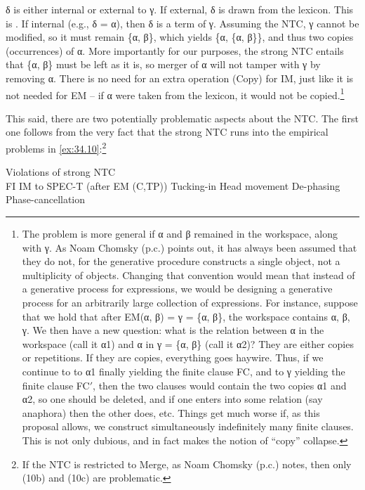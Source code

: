 \documentclass[output=paper]{langsci/langscibook}
\begin{document}
δ is either internal or external to γ. If external, δ is drawn from the
lexicon. This is . If internal (e.g., δ = α), then δ is a term of
γ.  Assuming the \gls{NTC}, γ cannot be modified, so it must remain \{α, β\},
which yields \{α, \{α, β\}\}, and thus two copies (occurrences) of α.  More
importantly for our purposes, the strong \gls{NTC} entails that \{α, β\} must be
left as it is, so merger of α will not tamper with γ by removing α.  There is
no need for an extra operation (Copy) for \gls{IM}, just like it is not needed for
\gls{EM} -- if α were taken from the lexicon, it would not be
copied.\footnote{The problem is more general if α and β remained in the
    workspace, along with γ. As Noam Chomsky (p.c.) points out, it has always
    been assumed that they do not, for the generative procedure constructs a
    single object, not a multiplicity of objects. Changing that convention
    would mean that instead of a generative process for expressions, we would
    be designing a generative process for an arbitrarily large collection of
    expressions. For instance, suppose that we hold that after \gls{EM}(α, β) =
    γ = \{α, β\}, the workspace contains α, β, γ. We then have a new question:
    what is the relation between α in the workspace (call it α1) and α in γ =
    \{α, β\} (call it α2)?  They are either copies or repetitions. If they are
    copies, everything goes haywire. Thus, if we continue to  to α1
    finally yielding the finite clause FC, and to γ yielding the finite clause
    FC$'$, then the two clauses would contain the two copies α1 and α2, so one
    should be deleted, and if one enters into some relation (say anaphora) then
    the other does, etc. Things get much worse if, as this proposal allows, we
construct simultaneously indefinitely many finite clauses. This is not only
dubious, and in fact makes the notion of \enquote{copy} collapse.}

This said, there are two potentially problematic aspects about the \gls{NTC}.
The first one follows from the very fact that the strong \gls{NTC} runs into
the empirical problems in \eqref{ex:34.10}:\footnote{If the \gls{NTC} is restricted to
Merge, as Noam Chomsky (p.c.) notes, then only (10b) and (10c) are
problematic.}

\ea%
    \label{ex:34.10} Violations of strong NTC\\
    \ea \glsdesc{FI} \parencite{Chomsky2008}
    \ex \gls{IM} to SPEC-T (after \gls{EM} (C,TP)) \parencite{Chomsky2008}
	\ex Tucking-in \parencite{Richards1997}
	\ex Head movement \parencite{Chomsky2001}
	\ex De-phasing \parencite{Chomsky2015}
    \ex Phase-cancellation \parencite{EKS2016}
	\z
\z
\end{document}

